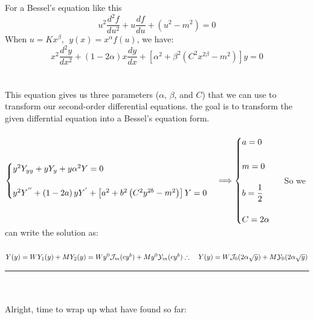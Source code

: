 \documentclass[fleqn]{article}
\begin{document}
\begin{enumerate}
\begin{enumerate}
{          For a Bessel’s equation like this $$u^2 \dfrac{d^2 f}{du^2}+u\dfrac{df}{du}+\left(u^2-m^2\right)=0$$
          When $u=Kx^{\beta}, ~~ y(x)=x^{\alpha} f(u)$, we have:
          $$x^2 \dfrac{d^2 y}{dx^2}+(1-2\alpha)x\dfrac{dy}{dx}+\left[\alpha^2 +\beta^2\left(C^2 x^{2\beta}-m^2\right)\right]y=0$$
          \\
          \\
          This equation gives us three parameters ($\alpha$, $\beta$, and $C$) that we can use to transform our
          second-order differential equations. the goal is to transform the given differntial equation into
          a Bessel’s equation form. \\
          \\
          $
            \begin{cases}
              y^2 Y_{yy}+y Y_y+y \alpha^2 Y=0 \\
              \\
              y^2 Y^{''}+\left(1-2a\right)y Y^{'}+\left[a^2+b^2\left(C^2 y^{2b}-m^2\right)\right]Y=0
            \end{cases} \Longrightarrow \begin{cases}
              a=0 \\
              \\
              m=0 \\
              \\
              b=\dfrac{1}{2} \\
              \\
              C=2 \alpha
            \end{cases} \\
            \\
            \\
          $
          So we can write the solution as: \\
          \\
          $
            Y(y)=W Y_1(y)+M Y_2(y)=W y^0 \mathcal{J}_m(cy^b) +M y^0 \mathcal{Y}_m(cy^b) \\
            \\
            \\
            \therefore ~~~ Y(y)=W \mathcal{J}_0(2 \alpha \sqrt{y}) +M \mathcal{Y}_0(2 \alpha \sqrt{y})
          $
          \\
          \rule{15cm}{1pt} \\
          \\
          Alright, time to wrap up what have found so far: \\
}
\end{enumerate}
\end{enumerate}
\end{document}
